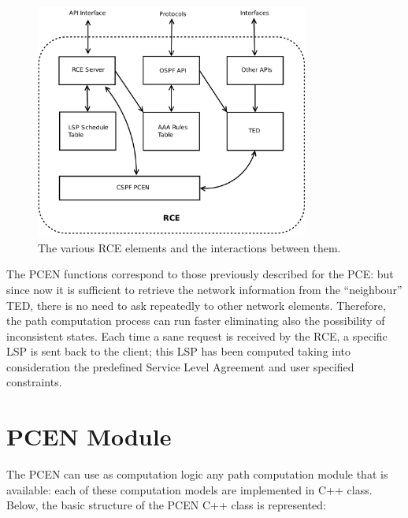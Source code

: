 \documentclass[10pt,a4paper]{report}
\begin{document}
\begin{figure}[!htbp]
  \begin{center}
    \includegraphics[width=0.8\textwidth]{img/rce_model}
    \caption[RCE model]{The various RCE elements and the
      interactions between them.}
    \label{fig:rce_model}
  \end{center}
\end{figure}

The PCEN functions correspond to those previously described for the
PCE: but since now it is sufficient to retrieve the network
information from the ``neighbour'' TED, there is no need to ask
repeatedly to other network elements. Therefore, the path computation
process can run faster eliminating also the possibility of
inconsistent states. Each time a sane request is received by the RCE,
a specific LSP is sent back to the client; this LSP has been computed
taking into consideration the predefined Service Level Agreement and
user specified constraints.

\section{PCEN Module}

The PCEN can use as computation logic any path computation module that
is available: each of these computation models are implemented in C++
class. Below, the basic structure of the PCEN C++ class is
represented:
\end{document}
